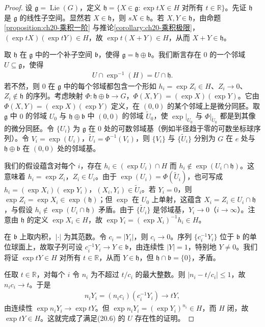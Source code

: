 \documentclass[../../main.tex]{subfiles}
\begin{document}
\begin{proof}
设 $\mathfrak g=\operatorname{Lie}(G)$，定义 $\mathfrak h=\{X\in\mathfrak g\colon \exp tX\in H\text{ 对所有 }t\in\mathbb{R}\}$。先证 $\mathfrak h$ 是 $\mathfrak g$ 的线性子空间。显然若 $X\in\mathfrak h$，则 $sX\in\mathfrak h$。若 $X,Y\in\mathfrak h$，由命题\cref{proposition:ch20-乘积一阶} 与推论\cref{corollary:ch20-乘积极限}，$(\exp tX)(\exp tY)\in H$，故 $\exp t(X+Y)\in H$，从而 $X+Y\in\mathfrak h$。

取 $\mathfrak h$ 在 $\mathfrak g$ 中的一个补子空间 $\mathfrak b$，使得 $\mathfrak g=\mathfrak h\oplus\mathfrak b$。我们断言存在 $0$ 的一个邻域 $U\subseteq\mathfrak g$，使得
\begin{align}
U\cap\exp^{-1}(H)=U\cap\mathfrak h.
\end{align}
若不然，则 $0$ 在 $\mathfrak g$ 中的每个邻域都包含一个形如 $h_i=\exp Z_i\in H$、$Z_i\to0$、$Z_i\notin\mathfrak h$ 的序列。考虑映射 $\Phi\colon\mathfrak h\oplus\mathfrak b\to G$，$\Phi(X,Y)=(\exp X)(\exp Y)$。它由 $\Phi(X,Y)=(\exp X)(\exp Y)$ 定义，在 $(0,0)$ 的某个邻域上是微分同胚。取 $\mathfrak g$ 中 $0$ 的邻域 $U_0$ 与 $\mathfrak h\oplus\mathfrak b$ 中 $(0,0)$ 的邻域 $\widetilde U_0$，使 $\exp|_{U_0}$ 与 $\Phi|_{\widetilde U_0}$ 都是到其像的微分同胚。令 $\{U_i\}$ 为 $\mathfrak g$ 在 $0$ 处的可数邻域基（例如半径趋于零的可数坐标球序列）。令 $V_i=\exp(U_i)$，$\widetilde U_i=\Phi^{-1}(V_i)$，则 $\{V_i\}$ 与 $\{\widetilde U_i\}$ 分别为 $G$ 在 $e$ 处与 $\mathfrak h\oplus\mathfrak b$ 在 $(0,0)$ 处的邻域基。

我们的假设蕴含对每个 $i$，存在 $h_i\in(\exp U_i)\cap H$ 而 $h_i\notin\exp(U_i\cap\mathfrak h)$。这意味着 $h_i=\exp Z_i$，$Z_i\in U_i$。由于 $\exp(U_i)=\Phi(\widetilde U_i)$，也可写成 $h_i=(\exp X_i)(\exp Y_i)$，$(X_i,Y_i)\in\widetilde U_i$。若 $Y_i=0$，则 $\exp Z_i=\exp X_i\in\exp(\mathfrak h)$；但 $\exp$ 在 $U_0$ 上单射，这蕴含 $X_i=Z_i\in U_i\cap\mathfrak h$，与假设 $h_i\notin\exp(U_i\cap\mathfrak h)$ 矛盾。由于 $\{\widetilde U_i\}$ 是邻域基，$Y_i\to0$（$i\to\infty$）。注意由 $\mathfrak h$ 的定义 $\exp X_i\in H$，故 $\exp Y_i=(\exp X_i)^{-1}h_i\in H$。

在 $\mathfrak b$ 上取内积，$|\cdot|$ 为其范数。令 $c_i=|Y_i|$，则 $c_i\to0$。序列 $\{c_i^{-1}Y_i\}$ 位于 $\mathfrak b$ 的单位球面上，故取子列可设 $c_i^{-1}Y_i\to Y\in\mathfrak b$，由连续性 $|Y|=1$，特别地 $Y\neq0$。我们将证 $\exp tY\in H$ 对所有 $t\in\mathbb{R}$，从而 $Y\in\mathfrak h$，但 $\mathfrak h\cap\mathfrak b=\{0\}$，矛盾。

任取 $t\in\mathbb{R}$，对每个 $i$ 令 $n_i$ 为不超过 $t/c_i$ 的最大整数。则 $|n_i-t/c_i|\leqslant1$，故 $n_ic_i\to t$。于是
\begin{align*}
n_iY_i=(n_ic_i)(c_i^{-1}Y_i)\to tY,
\end{align*}
由连续性 $\exp n_iY_i\to\exp tY$。但 $\exp n_iY_i=(\exp Y_i)^{n_i}\in H$，而 $H$ 闭，故 $\exp tY\in H$。这就完成了满足(20.6) 的 $U$ 存在性的证明。


\end{proof}
\end{document}
